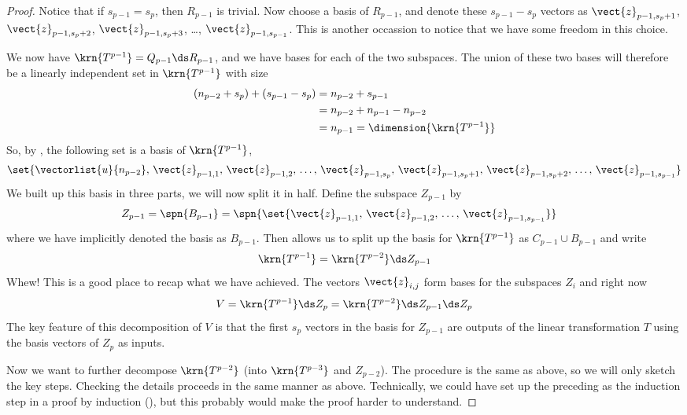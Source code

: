 \begin{proof}
%
Notice that if $s_{p-1}=s_p$, then $R_{p-1}$ is trivial.   Now choose a basis of $R_{p-1}$, and denote these $s_{p-1}-s_p$ vectors as $\vect{z}_{p-1,s_p+1}$, $\vect{z}_{p-1,s_p+2}$, $\vect{z}_{p-1,s_p+3}$, \dots, $\vect{z}_{p-1,s_{p-1}}$.  This is another occassion to notice that we have some freedom in this choice.\par
%
We now have $\krn{T^{p-1}}=Q_{p-1}\ds R_{p-1}$, and we have bases for each of the two subspaces.  The union of these two bases will therefore be a linearly independent set in $\krn{T^{p-1}}$ with size 
%
\begin{align*}
\left(n_{p-2}+s_p\right)+\left(s_{p-1}-s_p\right)
&=n_{p-2}+s_{p-1}\\
&=n_{p-2}+n_{p-1}-n_{p-2}\\
&=n_{p-1}=\dimension{\krn{T^{p-1}}}
\end{align*}
%
So, by , the following set is a basis of $\krn{T^{p-1}}$,
%
\begin{align*}
\set{
\vectorlist{u}{n_{p-2}},\,
\vect{z}_{p-1,1},\,\vect{z}_{p-1,2},\,\dots,\,\vect{z}_{p-1,s_p},\,
\vect{z}_{p-1,s_p+1},\,\vect{z}_{p-1,s_p+2},\,\dots,\,\vect{z}_{p-1,s_{p-1}}
}
\end{align*}
%
We built up this basis in three parts, we will now split it in half.  Define the subspace $Z_{p-1}$ by
%
\begin{align*}
Z_{p-1}
&=\spn{B_{p-1}}=
\spn{\set{
\vect{z}_{p-1,1},\,\vect{z}_{p-1,2},\,\dots,\,\vect{z}_{p-1,s_{p-1}}
}}
\end{align*}
%
where we have implicitly denoted the basis as $B_{p-1}$.  Then  allows us to split up the basis for $\krn{T^{p-1}}$ as $C_{p-1}\cup B_{p-1}$ and write
%
\begin{align*}
\krn{T^{p-1}}=\krn{T^{p-2}}\ds Z_{p-1}
\end{align*}
%
Whew!  This is a good place to recap what we have achieved.  The vectors $\vect{z}_{i,j}$ form bases for the subspaces $Z_i$ and right now
%
\begin{align*}
V=\krn{T^{p-1}}\ds Z_{p}=\krn{T^{p-2}}\ds Z_{p-1}\ds Z_{p}
\end{align*}
%
The key feature of this decomposition of $V$ is that the first $s_p$ vectors in the basis for $Z_{p-1}$ are outputs of the linear transformation $T$ using the basis vectors of $Z_p$ as inputs.\par
%
Now we want to further decompose $\krn{T^{p-2}}$ (into $\krn{T^{p-3}}$ and $Z_{p-2}$).  The procedure is the same as above, so we will only sketch the key steps.  Checking the details proceeds in the same manner as above.  Technically, we could have set up the preceding as the induction step in a proof by induction (), but this probably would make the proof harder to understand.\par

\end{proof}
